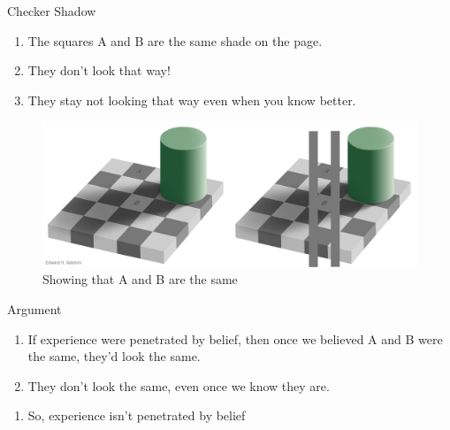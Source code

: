 \documentclass[
  17pt,
  letterpaper,
  ignorenonframetext,
  aspectratio=169,
  xcolor={dvipsnames}]{beamer}
\providecommand{\tightlist}{%
  \setlength{\itemsep}{0pt}\setlength{\parskip}{0pt}}\usepackage{longtable,booktabs,array}
\begin{document}
\begin{frame}{Checker Shadow}
\protect\hypertarget{checker-shadow}{}
\begin{enumerate}[<+->]
\tightlist
\item
  The squares A and B are the same shade on the page.
\item
  They don't look that way!
\item
  They stay not looking that way even when you know better.
\end{enumerate}

\end{frame} \begin{frame}[plain]

\begin{figure}

{\centering \includegraphics[width=\textwidth,height=0.8\textheight]{../images/checkershadow_double.jpg}

}

\caption{Showing that A and B are the same}

\end{figure}
\end{frame}

\begin{frame}{Argument}
\protect\hypertarget{argument}{}
\begin{enumerate}[<+->]
\tightlist
\item
  If experience were penetrated by belief, then once we believed A and B
  were the same, they'd look the same.
\item
  They don't look the same, even once we know they are.
\end{enumerate}

\begin{enumerate}[<+->]
[A.]
\setcounter{enumi}{2}
\tightlist
\item
  So, experience isn't penetrated by belief
\end{enumerate}
\end{frame}
\end{document}
